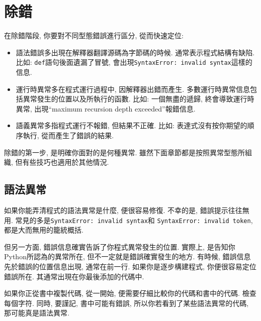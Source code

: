 \documentclass[10pt]{book}
\begin{document}
\appendix

\chapter{除錯}

在除錯階段, 你要對不同型態錯誤進行區分, 從而快速定位:

\begin{itemize}

\item 語法錯誤多出現在解釋器翻譯源碼為字節碼的時候. 
通常表示程式結構有缺陷. 
比如: {\tt def}語句後面遺漏了冒號, 會出現{\tt SyntaxError: invalid syntax}這樣的信息.

\item 運行時異常多在程式運行過程中, 因解釋器出錯而產生. 
多數運行時異常信息包括異常發生的位置以及所執行的函數. 
比如: 一個無盡的遞歸, 終會導致運行時異常, 出現``maximum recursion depth exceeded''報錯信息.

\item 語義異常多指程式運行不報錯, 但結果不正確.
比如: 表達式沒有按你期望的順序執行, 從而產生了錯誤的結果.

\end{itemize}

除錯的第一步, 是明確你面對的是何種異常. 
雖然下面章節都是按照異常型態所組織, 但有些技巧也適用於其他情況. 


\section{語法異常}

如果你能弄清程式的語法異常是什麼, 便很容易修復. 
不幸的是, 錯誤提示往往無用. 常見的多是{\tt SyntaxError: invalid syntax}和
{\tt SyntaxError: invalid token}, 都是大而無用的籠統概括. 

但另一方面, 錯誤信息確實告訴了你程式異常發生的位置. 
實際上, 是告知你Python所認為的異常所在, 但不一定就是錯誤確實發生的地方. 
有時候, 錯誤信息先於錯誤的位置信息出現, 通常在前一行. 
如果你是逐步構建程式, 你便很容易定位錯誤所在. 其通常出現在你最後添加的代碼中. 

如果你正從書中複製代碼, 從一開始, 便需要仔細比較你的代碼和書中的代碼. 
檢查每個字符. 同時, 要謹記, 書中可能有錯誤, 所以你若看到了某些語法異常的代碼, 
那可能真是語法異常. 
\end{document}
